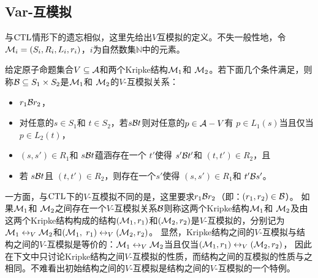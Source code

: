 \subsection{Var-互模拟}
与$\textrm{CTL}$情形下的遗忘相似，这里先给出$V$互模拟的定义。不失一般性地，令${\cal M}_i = (S_i, R_i, L_i, r_i)$，$i$为自然数集$\mathbb{N}$中的元素。
\begin{definition}[$V$-互模拟]\label{def:VB}
	给定原子命题集合$V \subseteq {\cal A}$和两个Kripke结构${\cal M}_1$和 ${\cal M}_2$。若下面几个条件满足，则称${\cal B}\subseteq S_1 \times S_2$是${\cal M}_1$和 ${\cal M}_2$的$V$-互模拟关系：
	\begin{itemize}
		\item $r_1 {\cal B} r_2$，
		\item 对任意的$s\in S_1$和 $t\in S_2$，若$s {\cal B} t$则对任意的$p \in {\cal A}- V$有 $p \in L_1(s)$当且仅当 $p \in L_2(t)$，
		\item $(s, s')\in R_1$和 $s {\cal B} t$蕴涵存在一个 $t'$使得 $s' {\cal B} t'$和 $(t, t')\in R_2$，且
		\item 若 $s {\cal B} t$且 $(t, t')\in R_2$，则存在一个$s'$使得 $(s, s')\in R_1$和 $t' {\cal B} s'$。
	\end{itemize}
\end{definition}

一方面，与$\textrm{CTL}$下的$V$-互模拟不同的是，这里要求$r_1 {\cal B} r_2$（即：$(r_1,r_2)\in {\cal B}$）。
如果${\cal M}_1$和 ${\cal M}_2$之间存在一个$V$-互模拟关系${\cal B}$则称这两个Kripke结构${\cal M}_1$和 ${\cal M}_2$及由这两个Kripke结构构成的结构$({\cal M}_1,r_1)$和$({\cal M}_2,r_2)$是$V$-互模拟的，分别记为${\cal M}_1 \leftrightarrow_V {\cal M}_2$和$({\cal M}_1,$ $r_1) \leftrightarrow_V ({\cal M}_2,r_2)$。
显然，Kripke结构之间的$V$-互模拟与结构之间的$V$-互模拟是等价的：${\cal M}_1 \leftrightarrow_V {\cal M}_2$当且仅当$({\cal M}_1,r_1) \leftrightarrow_V ({\cal M}_2,r_2)$， 因此在下文中只讨论Kripke结构之间$V$-互模拟的性质，而结构之间的互模拟的性质与之相同。不难看出初始结构之间的$V$-互模拟是结构之间的$V$-互模拟的一个特例。


